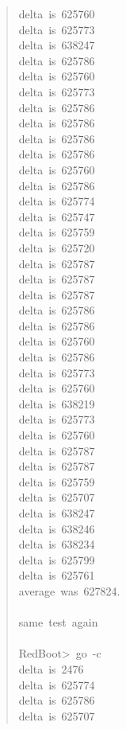\documentclass[letterpaper]{article}
\begin{document}
\begin{quote}
{delta~is~625760\\
delta~is~625773\\
delta~is~638247\\
delta~is~625786\\
delta~is~625760\\
delta~is~625773\\
delta~is~625786\\
delta~is~625786\\
delta~is~625786\\
delta~is~625786\\
delta~is~625760\\
delta~is~625786\\
delta~is~625774\\
delta~is~625747\\
delta~is~625759\\
delta~is~625720\\
delta~is~625787\\
delta~is~625787\\
delta~is~625787\\
delta~is~625786\\
delta~is~625786\\
delta~is~625760\\
delta~is~625786\\
delta~is~625773\\
delta~is~625760\\
delta~is~638219\\
delta~is~625773\\
delta~is~625760\\
delta~is~625787\\
delta~is~625787\\
delta~is~625759\\
delta~is~625707\\
delta~is~638247\\
delta~is~638246\\
delta~is~638234\\
delta~is~625799\\
delta~is~625761\\
average~was~627824.\\
~\\
same~test~again\\
~\\
RedBoot>~go~-c\\
delta~is~2476\\
delta~is~625774\\
delta~is~625786\\
delta~is~625707\\
}
\end{quote}
\end{document}
